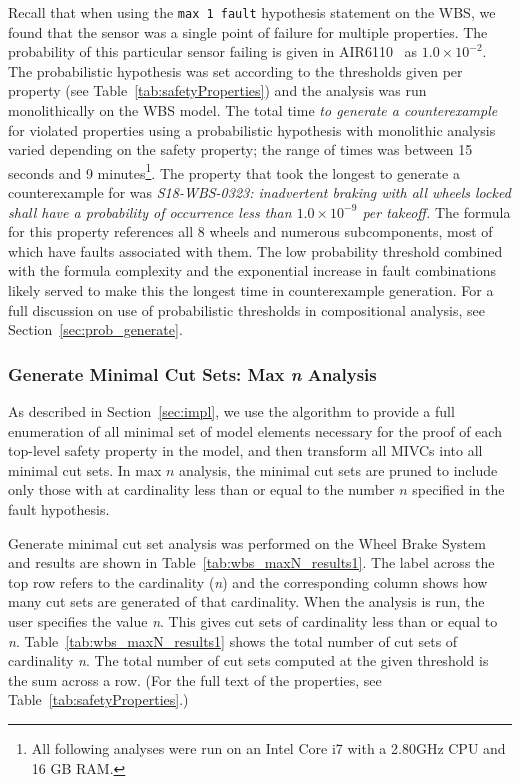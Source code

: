 Recall that when using the \texttt{max 1 fault} hypothesis statement on the WBS, we found that the sensor was a single point of failure for multiple properties. The probability of this particular sensor failing is given in AIR6110~\cite{AIR6110} as $1.0 \times 10^{-2}$. The probabilistic hypothesis was set according to the thresholds given per property (see Table~\ref{tab:safetyProperties}) and the analysis was run monolithically on the WBS model. The total time {\em to generate a counterexample} for violated properties using a probabilistic hypothesis with monolithic analysis varied depending on the safety property; the range of times was between 15 seconds and 9 minutes\footnote{All following analyses were run on an Intel Core i7 with a 2.80GHz CPU and 16 GB RAM. }. 
The property that took the longest to generate a counterexample for was {\em S18-WBS-0323: inadvertent braking with all wheels locked shall have a probability of occurrence less than $1.0 \times 10^{-9}$ per takeoff.} The formula for this property references all 8 wheels and numerous subcomponents, most of which have faults associated with them. The low probability threshold combined with the formula complexity and the exponential increase in fault combinations likely served to make this the longest time in counterexample generation. For a full discussion on use of probabilistic thresholds in compositional analysis, see Section~\ref{sec:prob_generate}.

\subsubsection{Generate Minimal Cut Sets: Max \textit{n} Analysis}
\label{sec:maxN_generate}
As described in Section~\ref{sec:impl}, we use the \aivcalg algorithm to provide a full enumeration of all minimal set of model elements necessary for the proof of each top-level safety property in the model, and then transform all MIVCs into all minimal cut sets. In max $n$ analysis, the minimal cut sets are pruned to include only those with at cardinality less than or equal to the number $n$ specified in the fault hypothesis.

Generate minimal cut set analysis was performed on the Wheel Brake System and results are shown in Table~\ref{tab:wbs_maxN_results1}. The label across the top row refers to the cardinality (\textit{n}) and the corresponding column shows how many cut sets are generated of that cardinality. When the analysis is run, the user specifies the value \textit{n}. This gives cut sets of cardinality less than or equal to \textit{n}. Table~\ref{tab:wbs_maxN_results1} shows the total number of cut sets of cardinality \textit{n}. The total number of cut sets computed at the given threshold is the sum across a row. (For the full text of the properties, see Table~\ref{tab:safetyProperties}.) 



